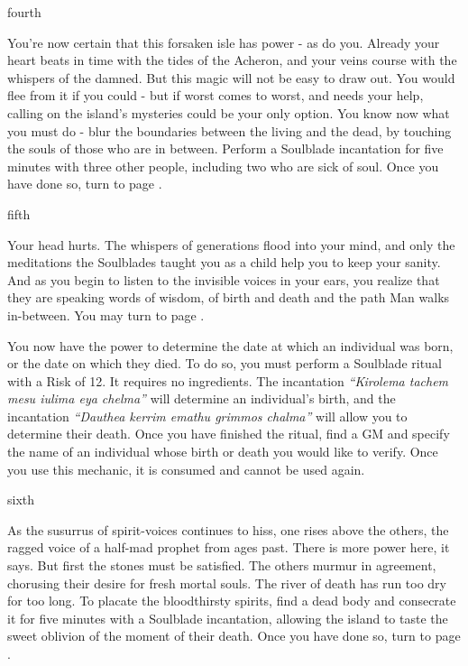 \documentclass[greennotebook]{Kos}
\begin{document}
\begin{page}{fourth}

You’re now certain that this forsaken isle has power - as do you. Already your heart beats in time with the tides of the Acheron, and your veins course with the whispers of the damned. But this magic will not be easy to draw out. You would flee from it if you could - but if worst comes to worst, and \cBride{} needs your help, calling on the island’s mysteries could be your only option. You know now what you must do - blur the boundaries between the living and the dead, by touching the souls of those who are in between. Perform a Soulblade incantation for five minutes with three other people, including two who are sick of soul. Once you have done so, turn to page .

\end{page}

\begin{page}{fifth}

Your head hurts. The whispers of generations flood into your mind, and only the meditations the Soulblades taught you as a child help you to keep your sanity. And as you begin to listen to the invisible voices in your ears, you realize that they are speaking words of wisdom, of birth and death and the path Man walks in-between. You may turn to page . 

You now have the power to determine the date at which an individual was born, or the date on which they died. To do so, you must perform a Soulblade ritual with a Risk of 12. It requires no ingredients. The incantation \emph{“Kirolema tachem mesu iulima eya chelma”} will determine an individual’s birth, and the incantation \emph{“Dauthea kerrim emathu grimmos chalma”} will allow you to determine their death. Once you have finished the ritual, find a GM and specify the name of an individual whose birth or death you would like to verify. Once you use this mechanic, it is consumed and cannot be used again. 

\end{page}

\begin{page}{sixth}

As the susurrus of spirit-voices continues to hiss, one rises above the others, the ragged voice of a half-mad prophet from ages past. There is more power here, it says. But first the stones must be satisfied. The others murmur in agreement, chorusing their desire for fresh mortal souls. The river of death has run too dry for too long. To placate the bloodthirsty spirits, find a dead body and consecrate it for five minutes with a Soulblade incantation, allowing the island to taste the sweet oblivion of the moment of their death. Once you have done so, turn to page .

\end{page}
\end{document}
